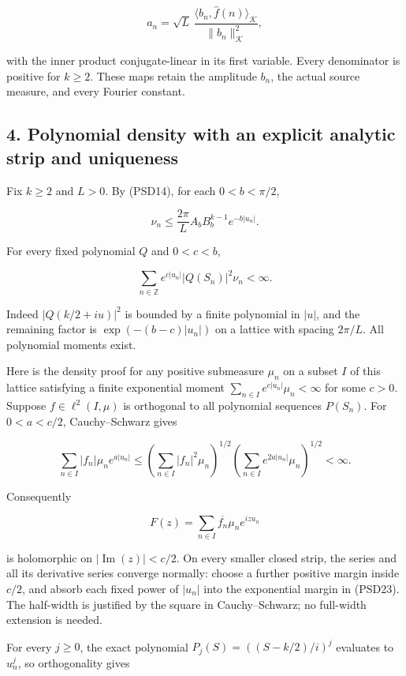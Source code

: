 \[
a_n=\sqrt L\,
\frac{\langle b_n,\widehat f(n)\rangle_{\mathcal K}}{\|b_n\|_{\mathcal K}^2},
\tag{PSD20}
\]

with the inner product conjugate-linear in its first variable. Every denominator is positive for \(k\ge 2\). These maps retain the amplitude \(b_n\), the actual source measure, and every Fourier constant.

\subsection{4. Polynomial density with an explicit analytic strip and uniqueness}\label{GraphV2:polynomial-density-with-an-explicit-analytic-strip-and-uniqueness}

Fix \(k\ge 2\) and \(L>0\). By (PSD14), for each \(0<b<\pi/2\),

\[
\nu_n\le\frac{2\pi}{L}A_bB_b^{k-1}e^{-b|u_n|}.
\tag{PSD21}
\]

For every fixed polynomial \(Q\) and \(0<c<b\),

\[
\sum_{n\in\mathbb Z}e^{c|u_n|}|Q(S_n)|^2\nu_n<\infty.
\tag{PSD22}
\]

Indeed \(|Q(k/2+iu)|^2\) is bounded by a finite polynomial in \(|u|\), and the remaining factor is \(\exp(-(b-c)|u_n|)\) on a lattice with spacing \(2\pi/L\). All polynomial moments exist.

Here is the density proof for any positive submeasure \(\mu_n\) on a subset \(I\) of this lattice satisfying a finite exponential moment \(\sum_{n\in I}e^{c|u_n|}\mu_n<\infty\) for some \(c>0\). Suppose \(f\in\ell^2(I,\mu)\) is orthogonal to all polynomial sequences \(P(S_n)\). For \(0<a<c/2\), Cauchy--Schwarz gives

\[
\sum_{n\in I}|f_n|\mu_ne^{a|u_n|}
\le\left(\sum_{n\in I}|f_n|^2\mu_n\right)^{1/2}
\left(\sum_{n\in I}e^{2a|u_n|}\mu_n\right)^{1/2}<\infty.
\tag{PSD23}
\]

Consequently

\[
F(z)=\sum_{n\in I}\overline{f_n}\mu_ne^{izu_n}
\tag{PSD24}
\]

is holomorphic on \(|\operatorname{Im}(z)|<c/2\). On every smaller closed strip, the series and all its derivative series converge normally: choose a further positive margin inside \(c/2\), and absorb each fixed power of \(|u_n|\) into the exponential margin in (PSD23). The half-width is justified by the square in Cauchy--Schwarz; no full-width extension is needed.

For every \(j\ge 0\), the exact polynomial \(P_j(S)=((S-k/2)/i)^j\) evaluates to \(u_n^j\), so orthogonality gives

